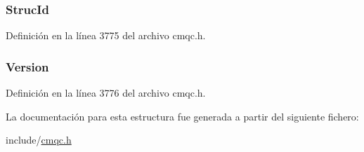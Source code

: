\subsubsection[{Struc\+Id}]{ Struc\+Id}\label{structtag_m_q_b_o_a0530922ca944569b52601d74941f96e4}


Definición en la línea 3775 del archivo cmqc.\+h.

\hypertarget{structtag_m_q_b_o_a0656ef8f766b3907d394d88a35d7b7e9}{}
\subsubsection[{Version}]{ Version}\label{structtag_m_q_b_o_a0656ef8f766b3907d394d88a35d7b7e9}


Definición en la línea 3776 del archivo cmqc.\+h.



La documentación para esta estructura fue generada a partir del siguiente fichero\+:\begin{DoxyCompactItemize}
\item 
include/\hyperlink{cmqc_8h}{cmqc.\+h}\end{DoxyCompactItemize}
